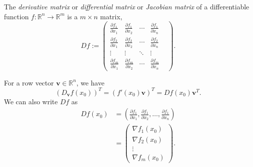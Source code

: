 \begin{defn}
  The \emph{derivative matrix} or \emph{differential matrix}
  or \emph{Jacobian matrix} of a differentiable function
  \mbox{$f: \mathbb{R}^n\rightarrow\mathbb{R}^m$}
  is a $m\times n$ matrix,
  \begin{equation}
    \label{eq:JacobianMatrix}
    Df :=
    \begin{pmatrix}
      \frac{\partial f_1}{\partial x_1}
      &
      \frac{\partial f_1}{\partial x_2}
      & \cdots &
      \frac{\partial f_1}{\partial x_n}
      \\
      \frac{\partial f_2}{\partial x_1}
      &
      \frac{\partial f_2}{\partial x_2}
      & \cdots &
      \frac{\partial f_2}{\partial x_n}
      \\
      \vdots & \vdots & \ddots & \vdots &
      \\
      \frac{\partial f_m}{\partial x_1}
      &
      \frac{\partial f_m}{\partial x_2}
      & \cdots &
      \frac{\partial f_m}{\partial x_n}
    \end{pmatrix}.
  \end{equation}
\end{defn}

\begin{rem}
  For a row vector $\mathbf{v}\in \mathbb{R}^n$,
  we have
  \begin{displaymath}
    (D_{\mathbf{v}} f(x_0))^T = (f'(x_0)\mathbf{v})^T = D f(x_0) \mathbf{v}^T.
  \end{displaymath}
  We can also write $D f$ as
  \begin{align*}
    Df(x_0) &= \left(
      \frac{\partial f_1}{\partial x_1},
      \frac{\partial f_1}{\partial x_2},
      \ldots, 
      \frac{\partial f_1}{\partial x_n}\right)
    \\
    &=
      \begin{pmatrix}
        \nabla f_1(x_0)
        \\
        \nabla f_2(x_0)
        \\
        \vdots
        \\
        \nabla f_m(x_0)
      \end{pmatrix}.
  \end{align*}
\end{rem}

